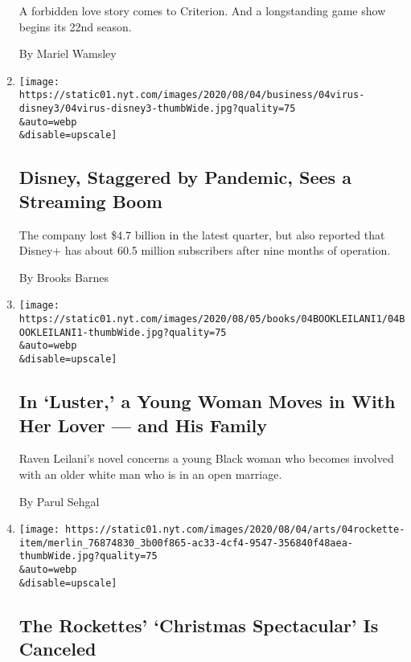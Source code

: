 \begin{enumerate}
  A forbidden love story comes to Criterion. And a longstanding game
  show begins its 22nd season.

  By Mariel Wamsley
\item
  \href{/2020/08/04/business/media/disney-earnings-coronavirus.html}{}

  \texttt{[image: https://static01.nyt.com/images/2020/08/04/business/04virus-disney3/04virus-disney3-thumbWide.jpg?quality=75\\\&auto=webp\\\&disable=upscale]}

  \hypertarget{disney-staggered-by-pandemic-sees-a-streaming-boom}{%
  \subsection{Disney, Staggered by Pandemic, Sees a Streaming
  Boom}\label{disney-staggered-by-pandemic-sees-a-streaming-boom}}

  The company lost \$4.7 billion in the latest quarter, but also
  reported that Disney+ has about 60.5 million subscribers after nine
  months of operation.

  By Brooks Barnes
\item
  \href{/2020/08/04/books/review-luster-raven-leilani.html}{}

  \texttt{[image: https://static01.nyt.com/images/2020/08/05/books/04BOOKLEILANI1/04BOOKLEILANI1-thumbWide.jpg?quality=75\\\&auto=webp\\\&disable=upscale]}

  \hypertarget{in-luster-a-young-woman-moves-in-with-her-lover--and-his-family}{%
  \subsection{In `Luster,' a Young Woman Moves in With Her Lover --- and
  His
  Family}\label{in-luster-a-young-woman-moves-in-with-her-lover--and-his-family}}

  Raven Leilani's novel concerns a young Black woman who becomes
  involved with an older white man who is in an open marriage.

  By Parul Sehgal
\item
  \href{/2020/08/04/theater/radio-city-rockettes-christmas-canceled.html}{}

  \texttt{[image: https://static01.nyt.com/images/2020/08/04/arts/04rockette-item/merlin\_76874830\_3b00f865-ac33-4cf4-9547-356840f48aea-thumbWide.jpg?quality=75\\\&auto=webp\\\&disable=upscale]}

  \hypertarget{the-rockettes-christmas-spectacular-is-canceled}{%
  \subsection{The Rockettes' `Christmas Spectacular' Is
  Canceled}\label{the-rockettes-christmas-spectacular-is-canceled}}


\end{enumerate}
